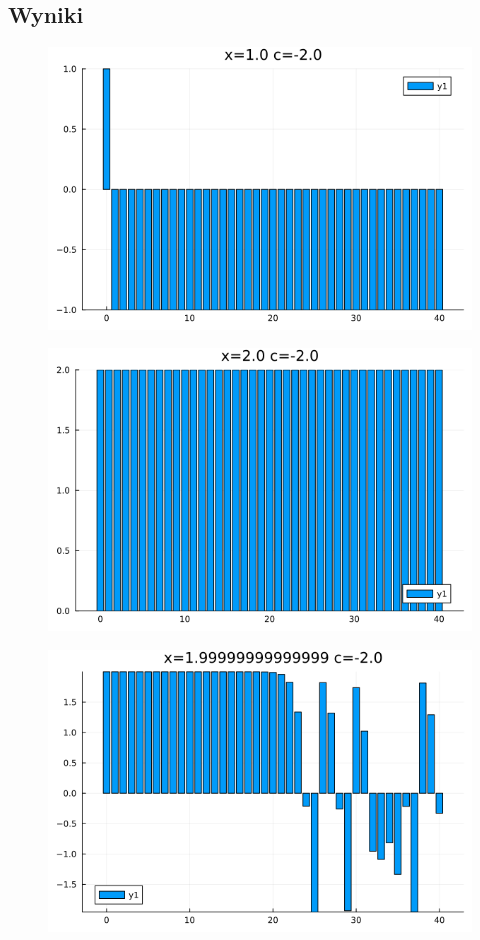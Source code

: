 \documentclass{article}
\begin{document}
    \subsection{Wyniki}
    \begin{figure}[H]
        \centering
        \includegraphics[width=0.75\linewidth]{6 x=1.0 c=-2.0.png}
        \label{fig:enter-label}
    \end{figure}
        \begin{figure}[H]
        \centering
        \includegraphics[width=0.75\linewidth]{6 x=2.0 c=-2.0.png}
        \label{fig:enter-label}
    \end{figure}
        \begin{figure}[H][H]
        \centering
        \includegraphics[width=0.75\linewidth]{6 x=1.99999999999999 c=-2.0.png}
        \label{fig:enter-label}
    \end{figure}
\end{document}
